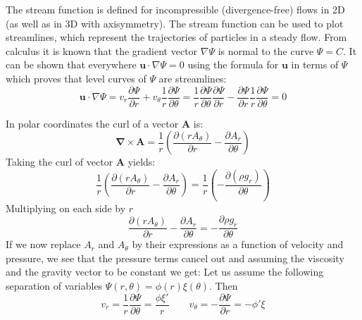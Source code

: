 The stream function is defined for incompressible (divergence-free) 
flows in 2D (as well as in 3D with axisymmetry).
The stream function can be used to plot streamlines, 
which represent the trajectories of particles in a steady flow.
From calculus it is known that the gradient vector $\nabla \Psi$
is normal to the curve $\Psi =C$. 
It can be shown that everywhere ${\boldsymbol {u}}\cdot \nabla \Psi =0$ 
using the formula for $\boldsymbol{u}$ in terms of 
$\Psi$ which proves that level curves of $\Psi$ are streamlines:
\[
{\bm u}\cdot \nabla \Psi 
= v_r \frac{\partial \Psi}{\partial r} + v_\theta \frac{1}{r} \frac{\partial \Psi}{\partial \theta} 
= \frac{1}{r}\frac{\partial \Psi}{\partial \theta} \frac{\partial \Psi}{\partial r} 
- \frac{\partial \Psi}{\partial r} \frac{1}{r} \frac{\partial \Psi}{\partial \theta} 
=0
\] 





In polar coordinates the curl of a vector ${\bm A}$ is:
\[
{\bm \nabla}\times {\bm A}
=
\frac{1}{r}\left(  
\frac{\partial (r A_\theta)}{\partial r}
-
\frac{\partial A_r}{\partial \theta}
\right)
\]
Taking the curl of vector ${\bm A}$ yields:
\[
\frac{1}{r}\left(  
\frac{\partial (r A_\theta)}{\partial r}
- \frac{\partial A_r}{\partial \theta}
\right)
=
\frac{1}{r}\left(  
- \frac{\partial (\rho g_r)}{\partial \theta}
\right)
\]
Multiplying on each side by $r$ 
\[
\frac{\partial (r A_\theta)}{\partial r}
- \frac{\partial A_r}{\partial \theta}
=
- \frac{\partial \rho g_r}{\partial \theta}
\]
If we now replace $A_r$ and $A_\theta$ by their expressions as a function of velocity and pressure, 
we see that the pressure terms cancel out 
and assuming the viscosity and the gravity vector to be constant we get:
Let us assume the following separation of variables $\boxed{\Psi(r,\theta)=\phi(r)\xi(\theta)}$.
Then 
\[
v_r = \frac{1}{r}\frac{\partial \Psi}{\partial \theta} = \frac{\phi \xi'}{r}
\quad\quad
v_\theta = - \frac{\partial \Psi}{\partial r} = -\phi' \xi
\]


